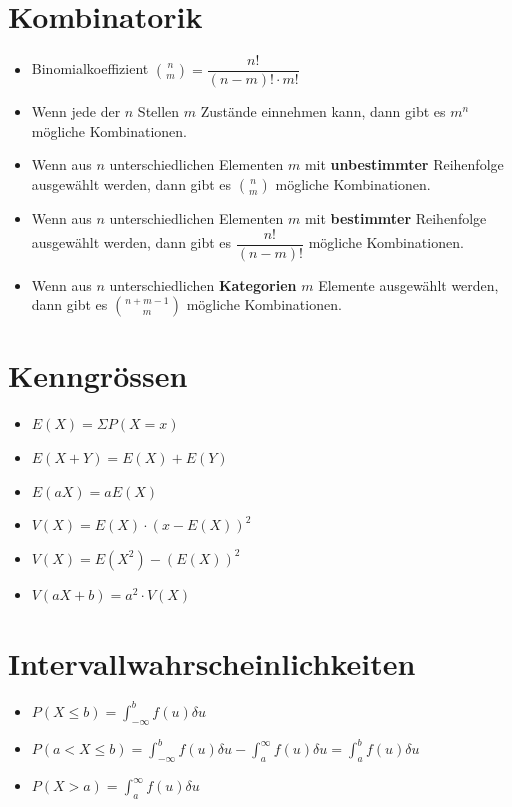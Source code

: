 \documentclass[8pt,a4paper]{scrartcl}
\begin{document}
\begin{multicols*}{3}
		\section{Kombinatorik}
			\begin{itemize}\itemsep0pt				
				\item Binomialkoeffizient ${n\choose m} = \dfrac{n!}{(n-m)!\cdot m!}$
				\item Wenn jede der $n$ Stellen $m$ Zustände einnehmen kann, dann gibt es $m^{n}$ mögliche Kombinationen.
				\item Wenn aus $n$ unterschiedlichen Elementen $m$ mit \textbf{unbestimmter} Reihenfolge ausgewählt werden, dann gibt es ${n\choose m}$ mögliche Kombinationen.
				\item Wenn aus $n$ unterschiedlichen Elementen $m$ mit  \textbf{bestimmter} Reihenfolge ausgewählt werden, dann gibt es $\dfrac{n!}{(n-m)!}$ mögliche Kombinationen.
				\item Wenn aus $n$ unterschiedlichen \textbf{Kategorien} $m$ Elemente ausgewählt werden, dann gibt es ${n+m-1\choose m}$ mögliche Kombinationen.
			\end{itemize}
			
		\section{Kenngrössen}
			\begin{itemize}\itemsep0pt				
				\item $E(X) = \Sigma P(X=x)$
				\item $E(X+Y) = E(X) + E(Y)$
				\item $E(aX) = aE(X)$
				\item $V(X) = E(X) \cdot (x-E(X))^{2}$
				\item $V(X) = E(X^{2}) - (E(X))^{2}$
				\item $V(aX+b) = a^{2} \cdot V(X)$
			\end{itemize}
			
		\section{Intervallwahrscheinlichkeiten}		
			\begin{itemize}\itemsep0pt				
				\item $P(X \leq b) = \int_{-\infty}^b f(u)\delta u$
				\item $P(a < X \leq b) = \int_{-\infty}^b f(u)\delta u - \int_a^\infty f(u)\delta u =  \int_a^b f(u)\delta u $
				\item $P(X > a) = \int_a^\infty f(u)\delta u$
			\end{itemize}	
			

\end{multicols*}
\end{document}
